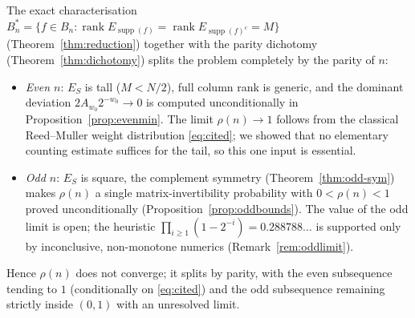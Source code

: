 \documentclass{amsart}
\theoremstyle{definition}
\DeclareMathOperator{\supp}{supp}
\DeclareMathOperator{\rank}{rank}
\begin{document}
The exact characterisation $B_n^*=\{f\in B_n:\rank E_{\supp(f)}=\rank
E_{\supp(f)^c}=M\}$ (Theorem~\ref{thm:reduction}) together with the parity
dichotomy (Theorem~\ref{thm:dichotomy}) splits the problem completely by
the parity of $n$:
\begin{itemize}
\item \emph{Even $n$}: $E_S$ is tall ($M<N/2$), full column rank is
generic, and the dominant deviation $2A_{w_0}2^{-w_0}\to0$ is computed
unconditionally in Proposition~\ref{prop:evenmin}. The limit
$\rho(n)\to1$ follows from the classical Reed--Muller weight distribution
\eqref{eq:cited}; we showed that no elementary counting estimate suffices
for the tail, so this one input is essential.
\item \emph{Odd $n$}: $E_S$ is square, the complement symmetry
(Theorem~\ref{thm:odd-sym}) makes $\rho(n)$ a single
matrix-invertibility probability with $0<\rho(n)<1$ proved
unconditionally (Proposition~\ref{prop:oddbounds}). The value of the
odd limit is open; the heuristic $\prod_{i\ge1}(1-2^{-i})=0.288788\ldots$
is supported only by inconclusive, non-monotone numerics
(Remark~\ref{rem:oddlimit}).
\end{itemize}
Hence $\rho(n)$ does not converge; it splits by parity, with the even
subsequence tending to $1$ (conditionally on \eqref{eq:cited}) and the odd
subsequence remaining strictly inside $(0,1)$ with an unresolved limit.
\end{document}
